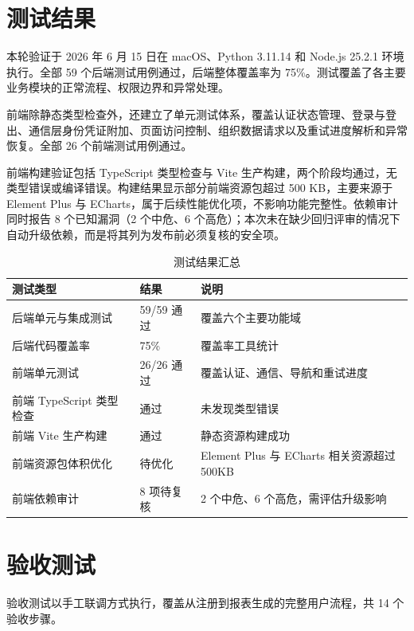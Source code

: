 

\section{测试结果}

本轮验证于 2026 年 6 月 15 日在 macOS、Python 3.11.14 和 Node.js 25.2.1 环境执行。全部 59 个后端测试用例通过，后端整体覆盖率为 75\%。测试覆盖了各主要业务模块的正常流程、权限边界和异常处理。

前端除静态类型检查外，还建立了单元测试体系，覆盖认证状态管理、登录与登出、通信层身份凭证附加、页面访问控制、组织数据请求以及重试进度解析和异常恢复。全部 26 个前端测试用例通过。

前端构建验证包括 TypeScript 类型检查与 Vite 生产构建，两个阶段均通过，无类型错误或编译错误。构建结果显示部分前端资源包超过 500 KB，主要来源于 Element Plus 与 ECharts，属于后续性能优化项，不影响功能完整性。依赖审计同时报告 8 个已知漏洞（2 个中危、6 个高危）；本次未在缺少回归评审的情况下自动升级依赖，而是将其列为发布前必须复核的安全项。

\begin{table}[H]
\centering
\caption{测试结果汇总}
\label{tab:test-results}
\begin{tabular}{p{6cm} p{3cm} p{4.5cm}}
\toprule
\textbf{测试类型} & \textbf{结果} & \textbf{说明} \\
\midrule
后端单元与集成测试 & 59/59 通过 & 覆盖六个主要功能域 \\
\hline
后端代码覆盖率 & 75\% & 覆盖率工具统计 \\
\hline
前端单元测试 & 26/26 通过 & 覆盖认证、通信、导航和重试进度 \\
\hline
前端 TypeScript 类型检查 & 通过 & 未发现类型错误 \\
\hline
前端 Vite 生产构建 & 通过 & 静态资源构建成功 \\
\hline
前端资源包体积优化 & 待优化 & Element Plus 与 ECharts 相关资源超过 500KB \\
\hline
前端依赖审计 & 8 项待复核 & 2 个中危、6 个高危，需评估升级影响 \\
\bottomrule
\end{tabular}
\end{table}

\section{验收测试}

验收测试以手工联调方式执行，覆盖从注册到报表生成的完整用户流程，共 14 个验收步骤。

